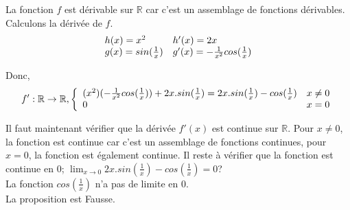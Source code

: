 \documentclass[]{book}
\theoremstyle{definition}
\newcommand{\bb}[1]{\mathbb{#1}}
\newcommand{\R}{\bb{R}}
\begin{document}
La fonction $f$ est d\'erivable sur $\R$ car c'est un assemblage de fonctions d\'erivables. Calculons la d\'eriv\'ee de $f$.
$$
\begin{array}{l l}
 h(x) = x^2 & h'(x)= 2x\\
 g(x) = sin(\frac{1}{x}) & g'(x)= -\frac{1}{x^2}cos(\frac{1}{x})\\
\end{array}
$$

Donc,
$$f': \R \to \R,
\left\{ 
\begin{array}{l l}
 (x^2)(-\frac{1}{x^2}cos(\frac{1}{x})) + 2x.sin(\frac{1}{x}) = 2x.sin(\frac{1}{x}) - cos(\frac{1}{x})& x \neq 0\\
 0 & x = 0\\
\end{array}
\right. 
$$

Il faut maintenant v\'erifier que la d\'eriv\'ee $f'(x)$ est continue sur $\R$. Pour $x \neq 0$, la fonction est continue car c'est un assemblage de fonctions continues, pour $x=0$, la fonction est \'egalement continue. Il reste \`a v\'erifier que la fonction est continue en $0$; $\lim_{x \to 0} 2x.sin(\frac{1}{x}) - cos(\frac{1}{x}) = 0$?\\

La fonction $cos(\frac{1}{x})$ n'a pas de limite en $0$.\\

La proposition est Fausse.
\end{document}
